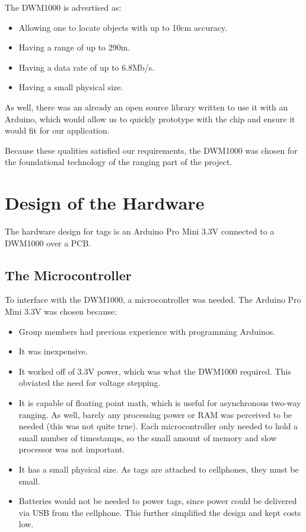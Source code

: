 The DWM1000 is advertised as:
\begin{itemize}
	\item Allowing one to locate objects with up to 10cm accuracy.
	\item Having a range of up to 290m.
	\item Having a data rate of up to 6.8Mb/s.
	\item Having a small physical size. 
\end{itemize}

As well, there was an already an open source library written to use it with an Arduino, which would allow us to quickly prototype with the chip and ensure it would fit for our application.

Because these qualities satisfied our requirements, the DWM1000 was chosen for the foundational technology of the ranging part of the project. 

\section{Design of the Hardware}
The hardware design for tags is an Arduino Pro Mini 3.3V connected to a DWM1000 over a PCB. 

\subsection{The Microcontroller}
To interface with the DWM1000, a microcontroller was needed. The Arduino Pro Mini 3.3V was chosen because:
\begin{itemize}
	\item Group members had previous experience with programming Arduinos.
	\item It was inexpensive.
	\item It worked off of 3.3V power, which was what the DWM1000 required. This obviated the need for voltage stepping.
	\item It is capable of floating point math, which is useful for asynchronous two-way ranging. As well, barely any processing power or RAM was perceived to be needed (this was not quite true). Each microcontroller only needed to hold a small number of timestamps, so the small amount of memory and slow processor was not important.
	\item It has a small physical size. As tags are attached to cellphones, they must be small.
	\item Batteries would not be needed to power tags, since power could be delivered via USB from the cellphone. This further simplified the design and kept costs low.
\end{itemize}


